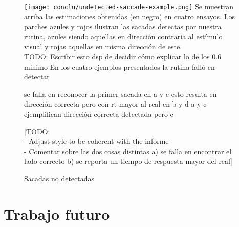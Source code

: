 \begin{itemize}
  \begin{figure}
    \centering
    \texttt{[image: conclu/undetected-saccade-example.png]}
    Se muestran arriba las estimaciones obtenidas (en negro) en cuatro ensayos.
    Los parches azules y rojos ilustran las sacadas detectas por nuestra
    rutina, azules siendo aquellas en dirección contraria al estímulo visual y
    rojas aquellas en misma dirección de este. \\
    TODO: Escribir esto dsp de decidir cómo explicar lo de los 0.6 minimo
    En los cuatro ejemplos presentados la rutina falló en detectar 


    se falla en reconocer la primer sacada
    en a y c esto resulta en dirección correcta pero con rt mayor al real
    en b y d 
    a y c ejemplifican dirección correcta detectada pero c

    [TODO: \\
    - Adjust style to be coherent with the informe \\
    - Comentar sobre las dos cosas distintas
      a) se falla en encontrar el lado correcto
      b) se reporta un tiempo de respuesta mayor del real]
    \caption{Sacadas no detectadas}
    \label{fig:undetected-saccade-example}
  \end{figure}

\end{itemize}

\section{Trabajo futuro}

